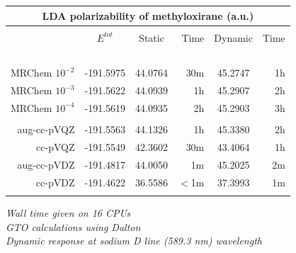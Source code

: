 \begin{frame}
\begin{table}
\begin{tabular}{r|c|cr|cr}
\multicolumn{6}{c}{\textbf{LDA polarizability of methyloxirane (a.u.)}}\\
\hline
\hline
	             &               &               &               &               &               \\
                     & $E^{tot}$     & Static        &Time           & Dynamic       &Time           \\
    \hspace{20mm}\   &\hspace{20mm}\ &\hspace{20mm}\ &\hspace{05mm}\ &\hspace{20mm}\ &\hspace{05mm}\ \\
    MRChem $10^{-2}$ & -191.5975     & 44.0764       &   30m         & 45.2747       &   1h          \\
    MRChem $10^{-3}$ & -191.5622     & 44.0939       &    1h         & 45.2907       &   2h          \\
    MRChem $10^{-4}$ & -191.5619     & 44.0935       &    2h         & 45.2903       &   3h          \\
	             &               &               &               &               &               \\
    aug-cc-pVQZ      & -191.5563     & 44.1326       &    1h         & 45.3380       &   2h          \\
	cc-pVQZ      & -191.5549     & 42.3602       &   30m         & 43.4064       &   1h          \\
    aug-cc-pVDZ      & -191.4817     & 44.0050       &    1m         & 45.2025       &   2m          \\
	cc-pVDZ      & -191.4622     & 36.5586       &    $<$1m      & 37.3993       &   1m          \\
	             &               &               &               &               &               \\
\hline
\hline
\end{tabular}
\end{table}

\centering
\scriptsize
\it{Wall time given on 16 CPUs}\\
\it{GTO calculations using Dalton}\\
\it{Dynamic response at sodium D line (589.3 nm) wavelength}

\end{frame}


